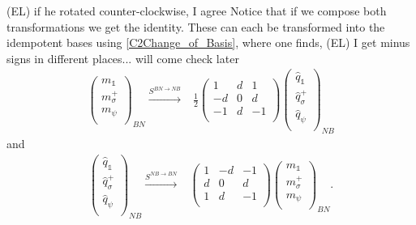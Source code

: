 \documentclass[12pt,a4paper]{article}
\newcounter{arrow}
\newcommand{\unit}{\mathds{1}}
\newcommand{\ethan}[1]{{\color{amethyst}\footnotesize{(EL) #1}}}
\begin{document}
\ethan{if he rotated counter-clockwise, I agree}
Notice that if we compose both transformations we get the identity. 
These can each be transformed into the idempotent bases using \eqref{C2Change_of_Basis}, 
where one finds,
\ethan{I get minus signs in different places... will come check later}
\begin{align}
\left( \begin{matrix}
m_\unit\\
m_\sigma^+\\
m_\psi\\
\end{matrix} \right)_{BN} 
\xrightarrow{S^{BN \rightarrow NB}} &\frac{1}{2} \left( \begin{matrix}
1&d&1\\
-d&0&d\\
-1&d&-1\\
\end{matrix} \right)
\left( \begin{matrix}
\hat{q}_\unit\\
\hat{q}_\sigma^+\\
\hat{q}_\psi\\
\end{matrix} \right)_{NB}
\end{align}
and
\begin{align}
\left( \begin{matrix}
\hat{q}_\unit\\
\hat{q}_\sigma^+\\
\hat{q}_\psi\\
\end{matrix} \right)_{NB} 
\xrightarrow{S^{NB \rightarrow BN}} & \left( \begin{matrix}
1&-d&-1\\
d&0&d\\
1&d&-1\\
\end{matrix} \right)
\left( \begin{matrix}
m_\unit\\
m_\sigma^+\\
m_\psi\\
\end{matrix} \right)_{BN}.
\end{align}
\end{document}
